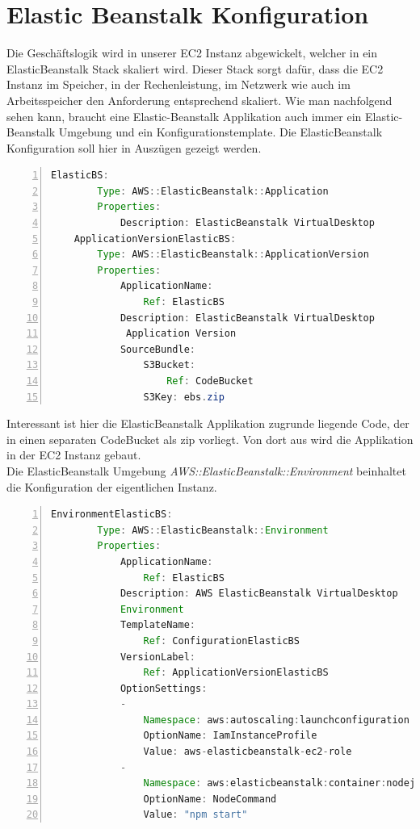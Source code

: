 \documentclass[a4paper, 12pt]{scrreprt}
\renewcommand\_{\textunderscore\allowbreak}
\begin{document}
\section{Elastic Beanstalk Konfiguration}
Die Geschäftslogik wird in unserer EC2 Instanz abgewickelt, welcher in ein ElasticBeanstalk Stack skaliert wird. Dieser Stack sorgt dafür, dass die EC2 Instanz im Speicher, in der Rechenleistung, im Netzwerk wie auch im Arbeitsspeicher den Anforderung entsprechend skaliert. Wie man nachfolgend sehen kann, braucht eine Elastic-Beanstalk Applikation auch immer ein Elastic-Beanstalk Umgebung und ein Konfigurationstemplate. Die ElasticBeanstalk Konfiguration soll hier in Auszügen gezeigt werden.
\bigskip
\begin{lstlisting}[xleftmargin=\parindent,numbers=left,numberstyle=\small,numbersep=8pt,frame=L,mathescape=true, basicstyle=\small, language=Java, lineskip={1.0pt}]
ElasticBS:
        Type: AWS::ElasticBeanstalk::Application
        Properties:
            Description: ElasticBeanstalk VirtualDesktop
    ApplicationVersionElasticBS:
        Type: AWS::ElasticBeanstalk::ApplicationVersion
        Properties:
            ApplicationName:
                Ref: ElasticBS
            Description: ElasticBeanstalk VirtualDesktop
             Application Version
            SourceBundle:
                S3Bucket:
                    Ref: CodeBucket
                S3Key: ebs.zip
\end{lstlisting}
\bigskip
Interessant ist hier die ElasticBeanstalk Applikation zugrunde liegende Code, der in einen separaten CodeBucket als zip vorliegt. Von dort aus wird die Applikation in der EC2 Instanz gebaut.\\
Die ElasticBeanstalk Umgebung
 \textit{AWS::ElasticBeanstalk::Environment} beinhaltet die Konfiguration der eigentlichen Instanz.
\bigskip
\begin{lstlisting}[xleftmargin=\parindent,numbers=left,numberstyle=\small,numbersep=8pt,frame=L,mathescape=true, basicstyle=\small, language=Java, lineskip={1.0pt}]
    EnvironmentElasticBS:
        Type: AWS::ElasticBeanstalk::Environment
        Properties:
            ApplicationName:
                Ref: ElasticBS
            Description: AWS ElasticBeanstalk VirtualDesktop 
            Environment
            TemplateName:
                Ref: ConfigurationElasticBS
            VersionLabel:
                Ref: ApplicationVersionElasticBS
            OptionSettings:
            -
                Namespace: aws:autoscaling:launchconfiguration 
                OptionName: IamInstanceProfile
                Value: aws-elasticbeanstalk-ec2-role
            -
                Namespace: aws:elasticbeanstalk:container:nodejs
                OptionName: NodeCommand
                Value: "npm start"
\end{lstlisting}
\end{document}
